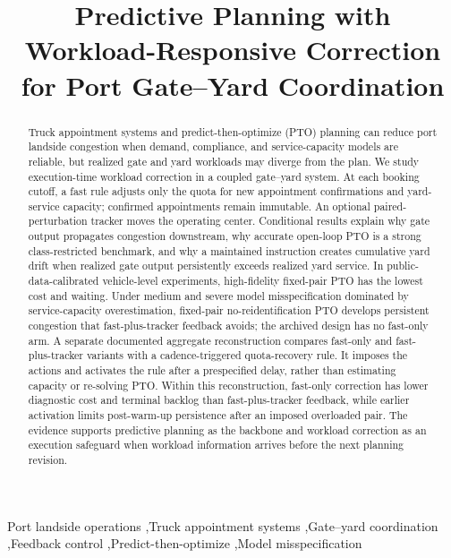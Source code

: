 \documentclass[preprint,12pt,authoryear,a4paper]{elsarticle}
\begin{document}
\linenumbers

\begin{frontmatter}

\title{Predictive Planning with Workload-Responsive Correction for Port Gate--Yard Coordination}

\begin{abstract}
Truck appointment systems and predict-then-optimize (PTO) planning can reduce port landside congestion when demand, compliance, and service-capacity models are reliable, but realized gate and yard workloads may diverge from the plan. We study execution-time workload correction in a coupled gate--yard system. At each booking cutoff, a fast rule adjusts only the quota for new appointment confirmations and yard-service capacity; confirmed appointments remain immutable. An optional paired-perturbation tracker moves the operating center. Conditional results explain why gate output propagates congestion downstream, why accurate open-loop PTO is a strong class-restricted benchmark, and why a maintained instruction creates cumulative yard drift when realized gate output persistently exceeds realized yard service. In public-data-calibrated vehicle-level experiments, high-fidelity fixed-pair PTO has the lowest cost and waiting. Under medium and severe model misspecification dominated by service-capacity overestimation, fixed-pair no-reidentification PTO develops persistent congestion that fast-plus-tracker feedback avoids; the archived design has no fast-only arm. A separate documented aggregate reconstruction compares fast-only and fast-plus-tracker variants with a cadence-triggered quota-recovery rule. It imposes the actions and activates the rule after a prespecified delay, rather than estimating capacity or re-solving PTO. Within this reconstruction, fast-only correction has lower diagnostic cost and terminal backlog than fast-plus-tracker feedback, while earlier activation limits post-warm-up persistence after an imposed overloaded pair. The evidence supports predictive planning as the backbone and workload correction as an execution safeguard when workload information arrives before the next planning revision.
\end{abstract}

\begin{keyword}
Port landside operations \sep Truck appointment systems \sep Gate--yard coordination \sep Feedback control \sep Predict-then-optimize \sep Model misspecification
\end{keyword}

\end{frontmatter}
\clearpage
\end{document}
